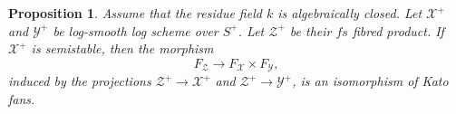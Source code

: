 \documentclass{amsart}%
\numberwithin{equation}{subsection}
\theoremstyle{plain2}
\newtheorem{prop}[equation]{Proposition}
\theoremstyle{definition2}
\theoremstyle{stepstyle}
\theoremstyle{point}
\theoremstyle{subpoint}
\newcommand{\N}{\ensuremath{\mathbb{N}}}
\newcommand{\cX}{\ensuremath{\mathscr{X}}}
\newcommand{\caC}{\ensuremath{\mathcal{C}}}
\newcommand{\cY}{\ensuremath{\mathscr{Y}}}
\newcommand{\cZ}{\ensuremath{\mathscr{Z}}}
\renewcommand{\cZ}{\ensuremath{\mathscr{Z}}}
\renewcommand{\cY}{\ensuremath{\mathscr{Y}}}
\begin{document}

\begin{prop} \label{prop semistability and iso Kato fans}
Assume that the residue field $k$ is algebraically closed. Let $\cX^+$ and $\cY^+$ be log-smooth log scheme over $S^+$. Let $\cZ^+$ be their $fs$ fibred product. If $\cX^+$ is semistable, then the morphism $$F_{\cZ}\xrightarrow{} F_{\cX} \times F_{\cY},$$ induced by the projections $\cZ^+ \rightarrow \cX^+$ and $\cZ^+ \rightarrow \cY^+$, is an isomorphism of Kato fans.
\end{prop}
\end{document}
